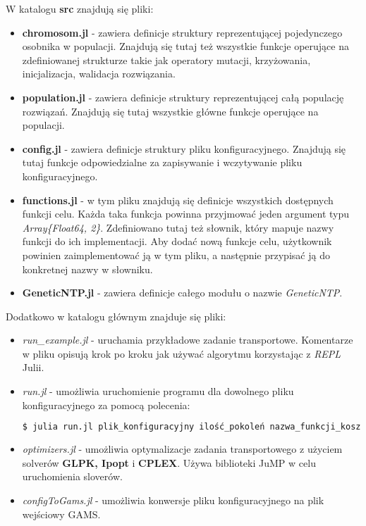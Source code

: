 W katalogu \textbf{src} znajdują się pliki:

\begin{itemize}
    \item \textbf{chromosom.jl} - zawiera definicje struktury reprezentującej pojedynczego osobnika w populacji. Znajdują się tutaj też wszystkie 
        funkcje operujące na zdefiniowanej strukturze takie jak operatory mutacji, krzyżowania, inicjalizacja, walidacja rozwiązania.
    \item \textbf{population.jl} - zawiera definicje struktury reprezentującej całą populację rozwiązań. Znajdują się tutaj wszystkie główne 
        funkcje operujące na populacji.
    \item \textbf{config.jl} - zawiera definicje struktury pliku konfiguracyjnego. Znajdują się tutaj funkcje odpowiedzialne za zapisywanie i wczytywanie 
        pliku konfiguracyjnego.
    \item \textbf{functions.jl} - w tym pliku znajdują się definicje wszystkich dostępnych funkcji celu. Każda taka funkcja powinna przyjmować 
        jeden argument typu \textit{Array\{Float64, 2\}}. Zdefiniowano tutaj też słownik, który mapuje nazwy funkcji do ich implementacji. Aby dodać 
        nową funkcje celu, użytkownik powinien zaimplementować ją w tym pliku, a następnie przypisać ją do konkretnej nazwy w słowniku.
    \item \textbf{GeneticNTP.jl} - zawiera definicje całego modułu o nazwie \textit{GeneticNTP}.
\end{itemize}

Dodatkowo w katalogu głównym znajduje się pliki:
\begin{itemize}
    \item \textit{run\_example.jl} - uruchamia przykładowe zadanie transportowe. Komentarze w pliku opisują krok po kroku jak używać algorytmu 
        korzystając z \textit{REPL} Julii.
    \item \textit{run.jl} - umożliwia uruchomienie programu dla dowolnego pliku konfiguracyjnego za pomocą polecenia:
    \begin{lstlisting}[language=bash]
$ julia run.jl plik_konfiguracyjny ilość_pokoleń nazwa_funkcji_kosztu
    \end{lstlisting}
    \item \textit{optimizers.jl} - umożliwia optymalizacje zadania transportowego z użyciem solverów \textbf{GLPK, Ipopt} i \textbf{CPLEX}. 
        Używa biblioteki JuMP w celu uruchomienia sloverów.
    \item \textit{configToGams.jl} - umożliwia konwersje pliku konfiguracyjnego na plik wejściowy GAMS.
\end{itemize} 

